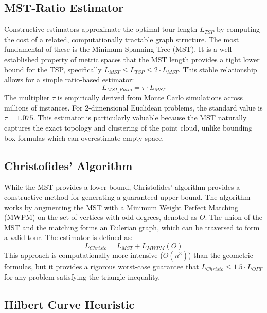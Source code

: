 \documentclass{article}
\begin{document}
\subsection{MST-Ratio Estimator}

Constructive estimators approximate the optimal tour length $L_{TSP}$ by computing the cost of a related, computationally tractable graph structure. The most fundamental of these is the Minimum Spanning Tree (MST). It is a well-established property of metric spaces that the MST length provides a tight lower bound for the TSP, specifically $L_{MST} \le L_{TSP} \le 2 \cdot L_{MST}$. This stable relationship allows for a simple ratio-based estimator:
\begin{equation}
L_{MST\_Ratio} = \tau \cdot L_{MST}
\end{equation}
The multiplier $\tau$ is empirically derived from Monte Carlo simulations across millions of instances. For 2-dimensional Euclidean problems, the standard value is $\tau = 1.075$. This estimator is particularly valuable because the MST naturally captures the exact topology and clustering of the point cloud, unlike bounding box formulas which can overestimate empty space.

\subsection{Christofides' Algorithm}

While the MST provides a lower bound, Christofides' algorithm \cite{christofides1976} provides a constructive method for generating a guaranteed upper bound. The algorithm works by augmenting the MST with a Minimum Weight Perfect Matching (MWPM) on the set of vertices with odd degrees, denoted as $O$. The union of the MST and the matching forms an Eulerian graph, which can be traversed to form a valid tour. The estimator is defined as:
\begin{equation}
L_{Christo} = L_{MST} + L_{MWPM}(O)
\end{equation}
This approach is computationally more intensive ($O(n^3)$) than the geometric formulas, but it provides a rigorous worst-case guarantee that $L_{Christo} \le 1.5 \cdot L_{OPT}$ for any problem satisfying the triangle inequality.

\subsection{Hilbert Curve Heuristic}
\end{document}
